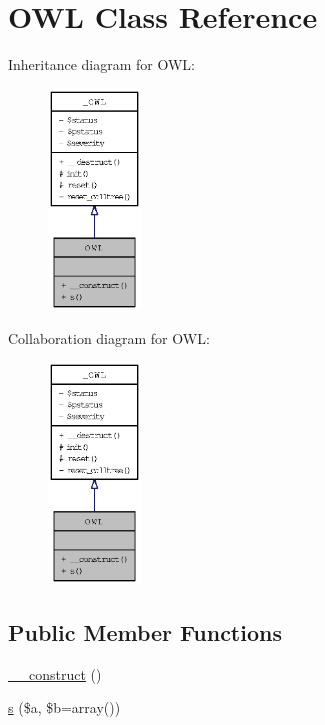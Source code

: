 \hypertarget{classOWL}{
\section{OWL Class Reference}
\label{classOWL}
}
Inheritance diagram for OWL:\nopagebreak
\begin{figure}[H]
\begin{center}
\leavevmode
\includegraphics[width=70pt]{classOWL__inherit__graph}
\end{center}
\end{figure}
Collaboration diagram for OWL:\nopagebreak
\begin{figure}[H]
\begin{center}
\leavevmode
\includegraphics[width=70pt]{classOWL__coll__graph}
\end{center}
\end{figure}
\subsection*{Public Member Functions}
\begin{CompactItemize}
\item 
\hyperlink{classOWL_9240437570d0787f35b7a1102ee39cc6}{\_\-\_\-construct} ()
\item 
\hyperlink{classOWL_4adf6bbba0af73025bdf9cfac01242fa}{s} (\$a, \$b=array())
\end{CompactItemize}
